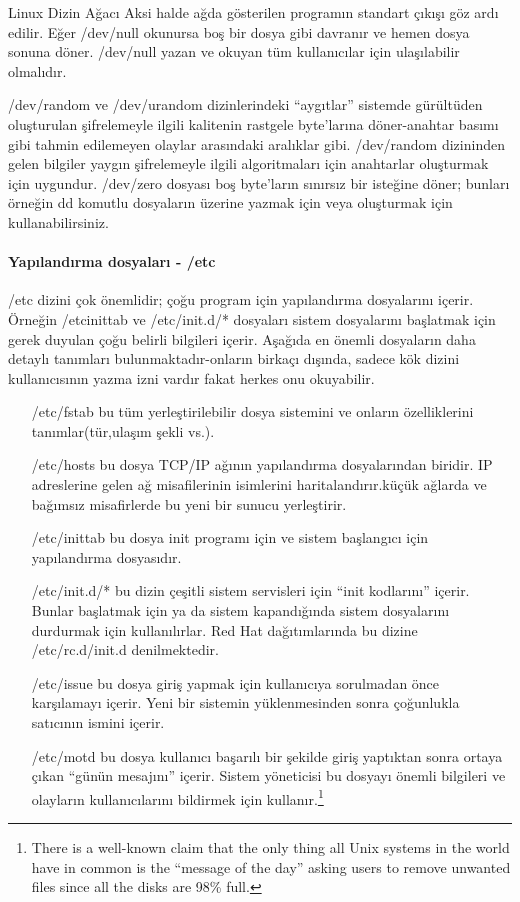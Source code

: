 \begin{section}{Linux Dizin Ağacı}
Aksi halde ağda gösterilen programın standart çıkışı göz ardı edilir. Eğer /dev/null okunursa boş bir dosya gibi davranır ve hemen dosya sonuna döner. /dev/null yazan ve okuyan tüm kullanıcılar için ulaşılabilir olmalıdır.

/dev/random ve /dev/urandom dizinlerindeki “aygıtlar” sistemde gürültüden oluşturulan şifrelemeyle ilgili kalitenin rastgele byte’larına döner-anahtar basımı gibi tahmin edilemeyen olaylar arasındaki aralıklar gibi. /dev/random dizininden gelen bilgiler yaygın şifrelemeyle ilgili algoritmaları için anahtarlar oluşturmak için uygundur. /dev/zero dosyası boş byte’ların sınırsız bir isteğine döner; bunları örneğin dd komutlu dosyaların üzerine yazmak için veya oluşturmak için kullanabilirsiniz.

\paragraph{Yapılandırma dosyaları - /etc}{/etc dizini çok önemlidir; çoğu program için yapılandırma dosyalarını içerir. Örneğin /etcinittab ve /etc/init.d/* dosyaları sistem dosyalarını başlatmak için gerek duyulan çoğu belirli bilgileri içerir. Aşağıda en önemli dosyaların daha detaylı tanımları bulunmaktadır-onların birkaçı dışında, sadece kök dizini kullanıcısının yazma izni vardır fakat herkes onu okuyabilir.}
\begin{itemize}
\item[/etc/fstab]bu tüm yerleştirilebilir dosya sistemini ve onların özelliklerini tanımlar(tür,ulaşım şekli vs.).
\item[/etc/hosts]bu dosya TCP/IP ağının yapılandırma dosyalarından biridir. IP adreslerine gelen ağ misafilerinin isimlerini haritalandırır.küçük ağlarda ve bağımsız misafirlerde bu yeni bir sunucu yerleştirir.
\item[/etc/inittab]bu dosya init programı için ve sistem başlangıcı için yapılandırma dosyasıdır.
\item[/etc/init.d/*]bu dizin çeşitli sistem servisleri için “init kodlarını” içerir. Bunlar başlatmak için ya da sistem kapandığında sistem dosyalarını durdurmak için kullanılırlar. Red Hat dağıtımlarında bu dizine /etc/rc.d/init.d denilmektedir.
\item[/etc/issue]bu dosya giriş yapmak için kullanıcıya sorulmadan önce karşılamayı içerir. Yeni bir sistemin yüklenmesinden sonra çoğunlukla satıcının ismini içerir.
\item[/etc/motd]bu dosya kullanıcı başarılı bir şekilde giriş yaptıktan sonra ortaya çıkan “günün mesajını” içerir. Sistem yöneticisi bu dosyayı önemli bilgileri ve olayların kullanıcılarını bildirmek için kullanır.\footnote{There is a well-known claim that the only thing all Unix systems in the world have in common is the “message of the day” asking users to remove unwanted files since all the disks are 98\% full.}

\end{itemize}
\end{section}
